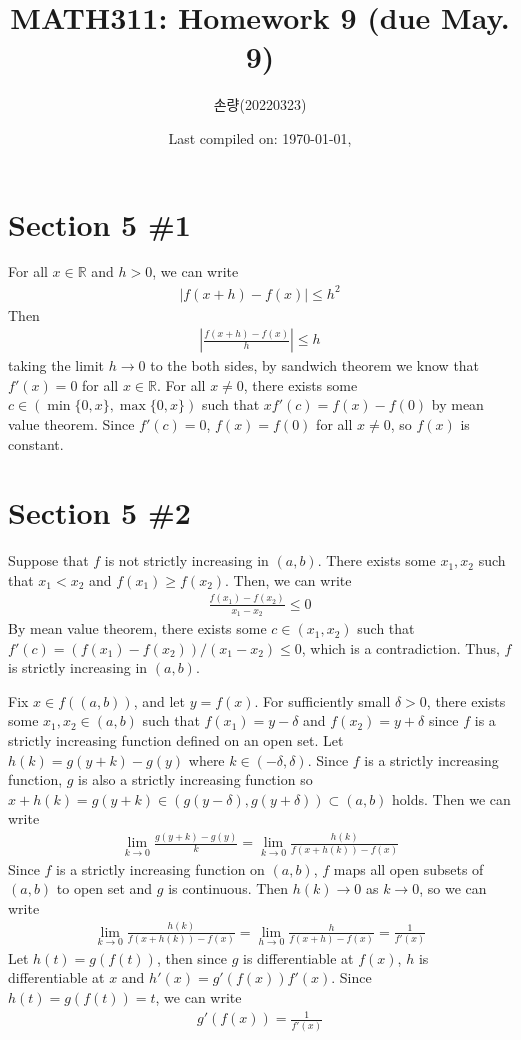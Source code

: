 \documentclass{scrartcl}
\title{MATH311: Homework 9 (due May. 9)}
\author{손량(20220323)}
\date{Last compiled on: \today, \currenttime}
\begin{document}
\maketitle

\section{Section 5 \#1}
For all \(x \in \mathbb{R}\) and \(h > 0\), we can write
\begin{align*}
  |f(x + h) - f(x)| \leq h^2
\end{align*}
Then
\begin{align*}
  \left| \frac{f(x + h) - f(x)}{h} \right| \leq h
\end{align*}
taking the limit \(h \to 0\) to the both sides, by sandwich theorem we know that \(f'(x) = 0\) for all \(x \in \mathbb{R}\).
For all \(x \not = 0\), there exists some \(c \in (\min\{0, x\}, \max\{0, x\})\) such that \(xf'(c) = f(x) - f(0)\) by mean value theorem.
Since \(f'(c) = 0\), \(f(x) = f(0)\) for all \(x \not = 0\), so \(f(x)\) is constant.

\section{Section 5 \#2}
Suppose that \(f\) is not strictly increasing in \((a, b)\).
There exists some \(x_1, x_2\) such that \(x_1 < x_2\) and \(f(x_1) \geq f(x_2)\).
Then, we can write
\begin{align*}
  \frac{f(x_1) - f(x_2)}{x_1 - x_2} \leq 0
\end{align*}
By mean value theorem, there exists some \(c \in (x_1, x_2)\) such that \(f'(c) = (f(x_1) - f(x_2)) / (x_1 - x_2) \leq 0\), which is a contradiction.
Thus, \(f\) is strictly increasing in \((a, b)\).

Fix \(x \in f((a, b))\), and let \(y = f(x)\).
For sufficiently small \(\delta > 0\), there exists some \(x_1, x_2 \in (a, b)\) such that \(f(x_1) = y - \delta\) and \(f(x_2) = y + \delta\) since \(f\) is a strictly increasing function defined on an open set.
Let \(h(k) = g(y + k) - g(y)\) where \(k \in (-\delta, \delta)\).
Since \(f\) is a strictly increasing function, \(g\) is also a strictly increasing function so \(x + h(k) = g(y + k) \in (g(y - \delta), g(y + \delta)) \subset (a, b)\) holds.
Then we can write
\begin{align*}
  \lim_{k \to 0} \frac{g(y + k) - g(y)}{k} = \lim_{k \to 0} \frac{h(k)}{f(x + h(k)) - f(x)}
\end{align*}
Since \(f\) is a strictly increasing function on \((a, b)\), \(f\) maps all open subsets of \((a, b)\) to open set and \(g\) is continuous.
Then \(h(k) \to 0\) as \(k \to 0\), so we can write
\begin{align*}
  \lim_{k \to 0} \frac{h(k)}{f(x + h(k)) - f(x)} = \lim_{h \to 0} \frac{h}{f(x + h) - f(x)} = \frac{1}{f'(x)}
\end{align*}
Let \(h(t) = g(f(t))\), then since \(g\) is differentiable at \(f(x)\), \(h\) is differentiable at \(x\) and \(h'(x) = g'(f(x))f'(x)\).
Since \(h(t) = g(f(t)) = t\), we can write
\begin{align*}
  g'(f(x)) = \frac{1}{f'(x)}
\end{align*}
\end{document}
